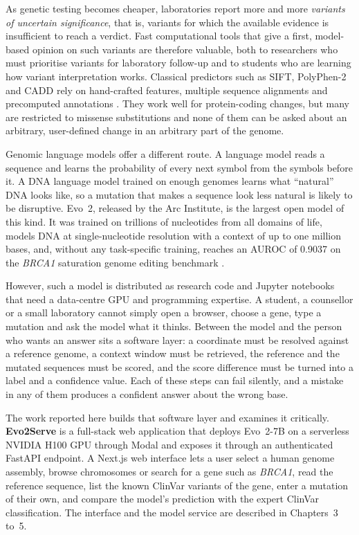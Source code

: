 As genetic testing becomes cheaper, laboratories report more and more \textit{variants of uncertain significance}, that is, variants for which the available evidence is insufficient to reach a verdict. Fast computational tools that give a first, model-based opinion on such variants are therefore valuable, both to researchers who must prioritise variants for laboratory follow-up and to students who are learning how variant interpretation works. Classical predictors such as SIFT, PolyPhen-2 and CADD rely on hand-crafted features, multiple sequence alignments and precomputed annotations \cite{ng2001sift,adzhubei2010polyphen2,rentzsch2019cadd}. They work well for protein-coding changes, but many are restricted to missense substitutions and none of them can be asked about an arbitrary, user-defined change in an arbitrary part of the genome.

Genomic language models offer a different route. A language model reads a sequence and learns the probability of every next symbol from the symbols before it. A DNA language model trained on enough genomes learns what ``natural'' DNA looks like, so a mutation that makes a sequence look less natural is likely to be disruptive. Evo~2, released by the Arc Institute, is the largest open model of this kind. It was trained on trillions of nucleotides from all domains of life, models DNA at single-nucleotide resolution with a context of up to one million bases, and, without any task-specific training, reaches an AUROC of 0.9037 on the \textit{BRCA1} saturation genome editing benchmark \cite{brixi2026evo2,findlay2018brca1}.

However, such a model is distributed as research code and Jupyter notebooks that need a data-centre GPU and programming expertise. A student, a counsellor or a small laboratory cannot simply open a browser, choose a gene, type a mutation and ask the model what it thinks. Between the model and the person who wants an answer sits a software layer: a coordinate must be resolved against a reference genome, a context window must be retrieved, the reference and the mutated sequences must be scored, and the score difference must be turned into a label and a confidence value. Each of these steps can fail silently, and a mistake in any of them produces a confident answer about the wrong base.
\par\noindent The work reported here builds that software layer and examines it critically. \textbf{Evo2Serve} is a full-stack web application that deploys Evo~2-7B on a serverless NVIDIA H100 GPU through Modal and exposes it through an authenticated FastAPI endpoint. A Next.js web interface lets a user select a human genome assembly, browse chromosomes or search for a gene such as \textit{BRCA1}, read the reference sequence, list the known ClinVar variants of the gene, enter a mutation of their own, and compare the model's prediction with the expert ClinVar classification. The interface and the model service are described in Chapters~3 to~5.

